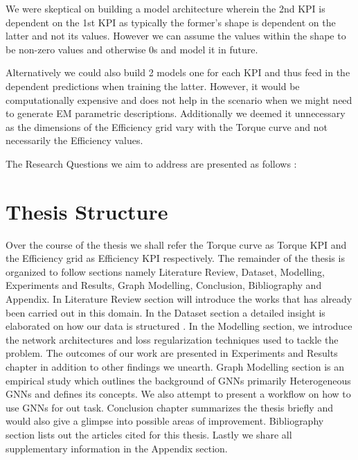 \documentclass{report} %
\begin{document}
We were skeptical on building a model architecture wherein the 2nd KPI is dependent on the 1st \ac{KPI} as typically the former's shape is dependent on the latter 
and not its values. However we can assume the values within the shape to be non-zero values and otherwise 0s and model it in future.

Alternatively we could also build 2 models one for each \ac{KPI} and thus feed in the dependent predictions when training the latter. 
However, it would be computationally expensive and does not help in the scenario when we might need to generate \ac{EM} parametric descriptions.
Additionally we deemed it unnecessary as the dimensions of the Efficiency grid vary with the Torque curve and not necessarily the Efficiency values. 

The Research Questions we aim to address are presented as follows :



\section{Thesis Structure}\label{sec:Thesis Structure}

Over the course of the thesis we shall refer the Torque curve as Torque \ac{KPI} and the Efficiency grid as Efficiency \ac{KPI} respectively.
The remainder of the thesis is organized to follow sections namely Literature Review, Dataset, Modelling, Experiments and Results, Graph Modelling, Conclusion, 
Bibliography and Appendix.
In Literature Review section will introduce the works that has already been carried out in this domain. 
In the Dataset section a detailed insight is elaborated on how our data is structured .
In the Modelling section, we introduce the network architectures and loss regularization techniques used to tackle the problem.
The outcomes of our work are presented in Experiments and Results chapter in addition to other findings we unearth.
Graph Modelling section is an empirical study which outlines the background of \ac{GNN}s primarily Heterogeneous \ac{GNN}s and defines its concepts. We also attempt to 
present a workflow on how to use \ac{GNN}s for out task.
Conclusion chapter summarizes the thesis briefly and would also give a glimpse into possible areas of improvement. 
Bibliography section lists out the articles cited for this thesis. 
Lastly we share all supplementary information in the Appendix section.

\newpage 
\end{document}
